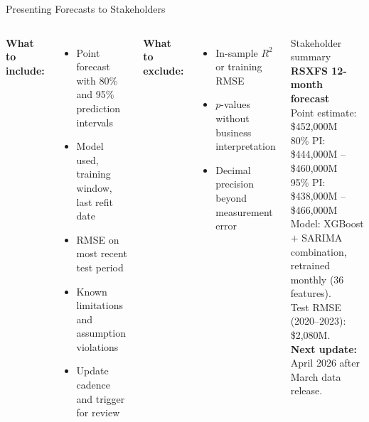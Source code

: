 \documentclass[aspectratio=169, 10pt]{beamer}
\begin{document}

\begin{frame}{Presenting Forecasts to Stakeholders}
  \begin{columns}[T]
      \textbf{What to include:}
      \begin{itemize}\small
        \item Point forecast with 80\% and 95\%
              prediction intervals
        \item Model used, training window, last
              refit date
        \item RMSE on most recent test period
        \item Known limitations and assumption violations
        \item Update cadence and trigger for review
      \end{itemize}
      \vspace{0.1cm}
      \textbf{What to exclude:}
      \begin{itemize}\small
        \item In-sample $R^2$ or training RMSE
        \item $p$-values without business interpretation
        \item Decimal precision beyond measurement error
      \end{itemize}
      \begin{examplebox}{Stakeholder summary}
        {\small \textbf{RSXFS 12-month forecast}\\
        Point estimate: \$452{,}000M\\
        80\% PI: \$444{,}000M -- \$460{,}000M\\
        95\% PI: \$438{,}000M -- \$466{,}000M\\[3pt]
        Model: XGBoost $+$ SARIMA combination,
        retrained monthly (36 features).\\
        Test RMSE (2020--2023): \$2{,}080M.\\[3pt]
        \textbf{Next update:} April 2026 after
        March data release.}
      \end{examplebox}
  \end{columns}
\end{frame}
\end{document}
